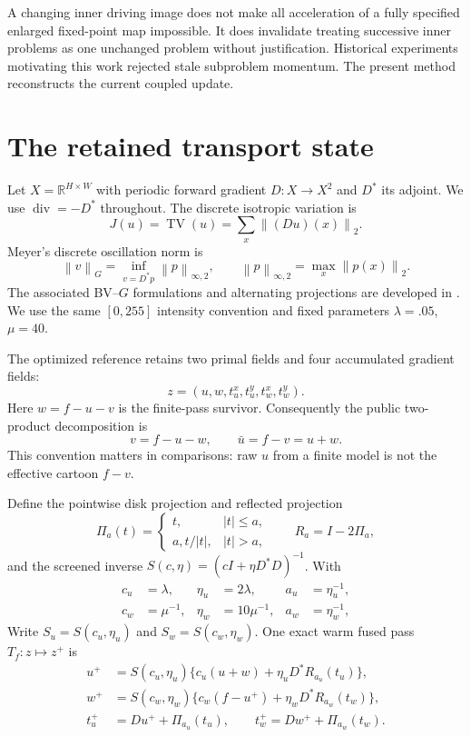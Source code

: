 \documentclass[10pt,twocolumn]{article}
\theoremstyle{definition}\newtheorem{remark}[proposition]{Remark}
\newcommand{\R}{\mathbb{R}}
\newcommand{\TV}{\operatorname{TV}}
\newcommand{\norm}[1]{\left\lVert#1\right\rVert}
\newcommand{\PiD}{\Pi}
\newcommand{\Tf}{T_f}
\begin{document}
A changing inner driving image does not make all acceleration of a fully
specified enlarged fixed-point map impossible. It does invalidate treating
successive inner problems as one unchanged problem without justification.
Historical experiments motivating this work rejected stale subproblem
momentum. The present method reconstructs the current coupled update.
\section{The retained transport state}

Let $X=\R^{H\times W}$ with periodic forward gradient $D:X\to X^2$ and
$D^*$ its adjoint. We use $\operatorname{div}=-D^*$ throughout. The discrete isotropic variation is
\begin{equation}
J(u)=\TV(u)=\sum_x \norm{(Du)(x)}_2 .
\end{equation}
Meyer's discrete oscillation norm is
\begin{equation}
\norm v_G=\inf_{v=D^*p}\norm p_{\infty,2},\qquad
\norm p_{\infty,2}=\max_x\norm{p(x)}_2 .
\label{eq:gnorm}
\end{equation}
The associated BV--$G$ formulations and alternating projections are
developed in \cite{meyer2001,aujol2005,gillesmeyer2024}.  We use the same
$[0,255]$ intensity convention and fixed parameters $\lambda=.05$, $\mu=40$.

The optimized reference retains two primal fields and four accumulated
gradient fields:
\begin{equation}
z=(u,w,t_u^x,t_u^y,t_w^x,t_w^y).
\label{eq:state}
\end{equation}
Here $w=f-u-v$ is the finite-pass survivor.  Consequently the public
two-product decomposition is
\begin{equation}
v=f-u-w,\qquad \bar u=f-v=u+w.
\label{eq:effective}
\end{equation}
This convention matters in comparisons: raw $u$ from a finite model is not
the effective cartoon $f-v$.

Define the pointwise disk projection and reflected projection
\begin{equation}
\PiD_a(t)=\begin{cases}t,&|t|\le a,\\a,t/|t|,&|t|>a,
\end{cases}\qquad R_a=I-2\PiD_a,
\label{eq:projection}
\end{equation}
and the screened inverse $S(c,\eta)=(cI+\eta D^*D)^{-1}$.  With
\begin{align}
c_u&=\lambda,&\eta_u&=2\lambda,&a_u&=\eta_u^{-1},\nonumber\\
c_w&=\mu^{-1},&\eta_w&=10\mu^{-1},&a_w&=\eta_w^{-1},
\end{align}
Write $S_u=S(c_u,\eta_u)$ and $S_w=S(c_w,\eta_w)$.
One exact warm fused pass $\Tf:z\mapsto z^+$ is
\begin{align}
u^+&=S(c_u,\eta_u)
 \{c_u(u+w)+\eta_uD^*R_{a_u}(t_u)\},\label{eq:upass}\\
w^+&=S(c_w,\eta_w)
 \{c_w(f-u^+)+\eta_wD^*R_{a_w}(t_w)\},\label{eq:wpass}\\
t_u^+&=Du^++\PiD_{a_u}(t_u),\qquad
t_w^+=Dw^++\PiD_{a_w}(t_w).\label{eq:tpass}
\end{align}
\end{document}
